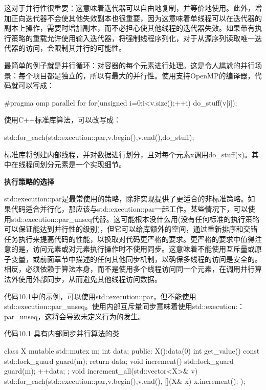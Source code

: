 这对于并行性很重要：这意味着迭代器可以自由地复制，并等价地使用。此外，增加正向迭代器不会使其他失效副本也很重要，因为这意味着单线程可以在迭代器的副本上操作，需要时增加副本，而不必担心使其他线程的迭代器失效。如果带有执行策略的重载允许使用输入迭代器，将强制线程序列化，对于从源序列读取唯一迭代器的访问，会限制其并行的可能性。


最简单的例子就是并行循环：对容器的每个元素进行处理。这是令人尴尬的并行场景：每个项目都是独立的，所以有最大的并行性。使用支持OpenMP的编译器，代码就可以写成：

\begin{cpp}
#pragma omp parallel for
for(unsigned i=0;i<v.size();++i){
  do_stuff(v[i]);
}
\end{cpp}

使用C++标准库算法，可以改写成：

\begin{cpp}
std::for_each(std::execution::par,v.begin(),v.end(),do_stuff);
\end{cpp}

标准库将创建内部线程，并对数据进行划分，且对每个元素x调用do\_stuff(x)。其中在线程间划分元素是一个实现细节。

\textbf{执行策略的选择}

std::execution::par是最常使用的策略，除非实现提供了更适合的非标准策略。如果代码适合并行化，那应该与std::execution::par一起工作。某些情况下，可以使用std::execution::par\_unseq代替。这可能根本没什么用(没有任何标准的执行策略可以保证能达到并行性的级别)，但它可以给库额外的空间，通过重新排序和交错任务执行来提高代码的性能，以换取对代码更严格的要求。更严格的要求中值得注意的是，访问元素或对元素执行操作时不使用同步。这意味着不能使用互斥量或原子变量，或前面章节中描述的任何其他同步机制，以确保多线程的访问是安全的。相反，必须依赖于算法本身，而不是使用多个线程访问同一个元素，在调用并行算法外使用外部同步，从而避免其他线程访问数据。

代码10.1中的示例，可以使用std::execution::par，但不能使用std::execution::par\_unseq。使用内部互斥量同步意味着使用std::execution:：par\_unseq，这将会导致未定义行为的发生。

代码10.1 具有内部同步并行算法的类

\begin{cpp}
class X{
  mutable std::mutex m;
  int data;
public:
  X():data(0){}
  int get_value() const{
    std::lock_guard guard(m);
    return data;
  }
  void increment(){
    std::lock_guard guard(m);
    ++data;
  }
};
void increment_all(std::vector<X>& v){
  std::for_each(std::execution::par,v.begin(),v.end(),
    [](X& x){
    x.increment();
    });
}
\end{cpp}

